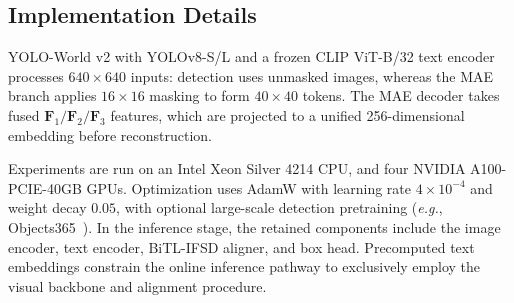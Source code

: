 \documentclass[letterpaper, 10 pt, conference]{ieeeconf}  %
\begin{document}
\subsection{Implementation Details}

YOLO-World v2 with YOLOv8-S/L and a frozen CLIP ViT-B/32 text encoder processes $640\times640$ inputs: detection uses unmasked images, whereas the MAE branch applies $16\times16$ masking to form $40\times40$ tokens. The MAE decoder takes fused $\mathbf{F}_1/\mathbf{F}_2/\mathbf{F}_3$ features, which are projected to a unified 256-dimensional embedding before reconstruction.

Experiments are run on an Intel Xeon Silver 4214 CPU, and four NVIDIA A100-PCIE-40GB GPUs. Optimization uses AdamW with learning rate $4\times10^{-4}$ and weight decay $0.05$, with optional large-scale detection pretraining (\textit{e.g.}, Objects365~\cite{shao2019objects365}). In the inference stage, the retained components include the image encoder, text encoder, BiTL-IFSD aligner, and box head. Precomputed text embeddings constrain the online inference pathway to exclusively employ the visual backbone and alignment procedure.
\end{document}
